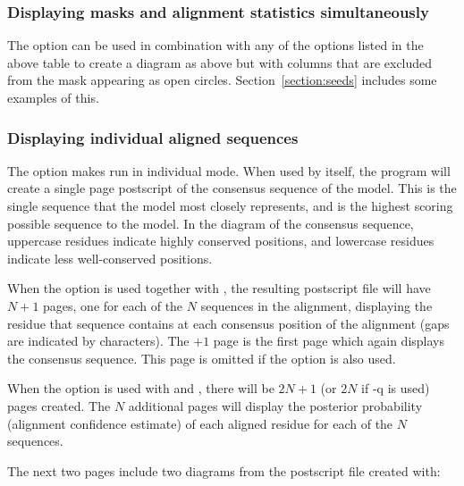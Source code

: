 \subsubsection{Displaying masks and alignment statistics simultaneously}

The  option can be used in combination with any of the
options listed in the above table to create a diagram as above but
with columns that are excluded from the mask appearing as open
circles. Section~\ref{section:seeds} includes some examples of this.

\subsubsection{Displaying individual aligned sequences}

The  option makes  run in individual
mode. When used by itself, the program will create a single page
postscript of the consensus sequence of the model. This is the
single sequence that the model most closely represents, and is the
highest scoring possible sequence to the model. In the diagram of the
consensus sequence, uppercase residues indicate highly conserved positions,
and lowercase residues indicate less well-conserved positions.

When the  option is used together with , the
resulting postscript file will have $N+1$ pages, one for each of the
$N$ sequences in the alignment, displaying the residue that sequence
contains at each consensus position of the alignment (gaps are
indicated by \prog{-} characters). The $+1$ page is the first page
which again displays the consensus sequence. This page is omitted if
the  option is also used.

When the  option is used with  and
, there will be $2N+1$ (or $2N$ if {\prog -q} is used)
pages created. The $N$ additional pages will display the posterior
probability (alignment confidence estimate) of each aligned residue
for each of the $N$ sequences.

The next two pages include two diagrams from the postscript file 
 created with:


